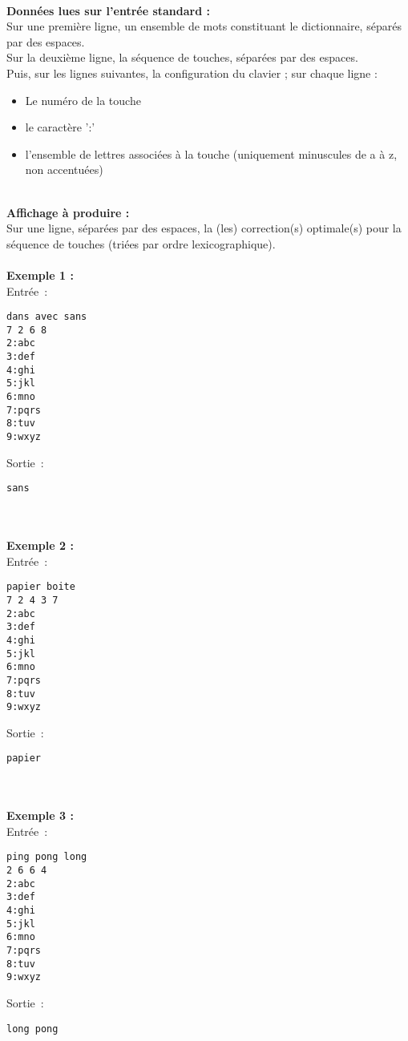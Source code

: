 \documentclass[10pt]{article}
\begin{document}
~\\
\textbf{Données lues sur l'entrée standard :}\\
Sur une première ligne, un ensemble de mots constituant le dictionnaire, séparés par des espaces.\\
Sur la deuxième ligne, la séquence de touches, séparées par des espaces.\\
Puis, sur les lignes suivantes, la configuration du clavier ; sur chaque ligne :
\begin{itemize}
\item Le numéro de la touche
\item le caractère ':'
\item l'ensemble de lettres associées à la touche (uniquement minuscules de a à z, non accentuées)
\end{itemize}
~\\
\textbf{Affichage à produire :}\\
Sur une ligne, séparées par des espaces, la (les) correction(s) optimale(s) pour la séquence de touches (triées par ordre lexicographique).
~\\
~\\
\noindent
\textbf{Exemple 1 :}\\
\noindent
Entrée~:
\begin{verbatim}
dans avec sans
7 2 6 8
2:abc
3:def
4:ghi
5:jkl
6:mno
7:pqrs
8:tuv
9:wxyz
\end{verbatim}

\noindent
Sortie~:
\begin{verbatim}
sans
\end{verbatim}
~\\
~\\
\noindent
\textbf{Exemple 2 :}\\
\noindent
Entrée~:
\begin{verbatim}
papier boite
7 2 4 3 7
2:abc
3:def
4:ghi
5:jkl
6:mno
7:pqrs
8:tuv
9:wxyz
\end{verbatim}

\noindent
Sortie~:
\begin{verbatim}
papier
\end{verbatim}
~\\
~\\
\noindent
\textbf{Exemple 3 :}\\
\noindent
Entrée~:
\begin{verbatim}
ping pong long
2 6 6 4
2:abc
3:def
4:ghi
5:jkl
6:mno
7:pqrs
8:tuv
9:wxyz
\end{verbatim}

\noindent
Sortie~:
\begin{verbatim}
long pong
\end{verbatim}
\end{document}
